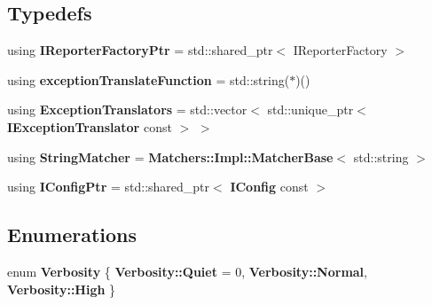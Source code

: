\subsection*{Typedefs}
\begin{DoxyCompactItemize}
\item 
using \textbf{ I\+Reporter\+Factory\+Ptr} = std\+::shared\+\_\+ptr$<$ I\+Reporter\+Factory $>$
\item 
using \textbf{ exception\+Translate\+Function} = std\+::string($\ast$)()
\item 
using \textbf{ Exception\+Translators} = std\+::vector$<$ std\+::unique\+\_\+ptr$<$ \textbf{ I\+Exception\+Translator} const  $>$ $>$
\item 
using \textbf{ String\+Matcher} = \textbf{ Matchers\+::\+Impl\+::\+Matcher\+Base}$<$ std\+::string $>$
\item 
using \textbf{ I\+Config\+Ptr} = std\+::shared\+\_\+ptr$<$ \textbf{ I\+Config} const  $>$
\end{DoxyCompactItemize}
\subsection*{Enumerations}
\begin{DoxyCompactItemize}
\item 
enum \textbf{ Verbosity} \{ \textbf{ Verbosity\+::\+Quiet} = 0, 
\textbf{ Verbosity\+::\+Normal}, 
\textbf{ Verbosity\+::\+High}
 \}
\end{DoxyCompactItemize}
